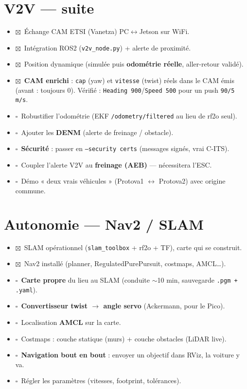 \documentclass[a4paper,11pt]{article}
\newcommand{\todo}{$\square$\ }
\newcommand{\done}{\textcolor{success}{$\boxtimes$}\ }
\begin{document}
\section{V2V --- suite}
\begin{itemize}[leftmargin=1.6em, label={}]
  \item \done Échange CAM ETSI (Vanetza) PC$\leftrightarrow$Jetson sur WiFi.
  \item \done Intégration ROS2 (\texttt{v2v\_node.py}) + alerte de proximité.
  \item \done Position dynamique (simulée puis \textbf{odométrie réelle}, aller-retour validé).
  \item \done \textbf{CAM enrichi} : \texttt{cap} (yaw) et \texttt{vitesse} (twist) réels dans
        le CAM émis (avant : toujours 0). Vérifié : \texttt{Heading 900}/\texttt{Speed 500}
        pour un push \texttt{90\textdegree{}/5\,m/s}.
  \item \todo Robustifier l'odométrie (EKF \texttt{/odometry/filtered} au lieu de rf2o seul).
  \item \todo Ajouter les \textbf{DENM} (alerte de freinage / obstacle).
  \item \todo \textbf{Sécurité} : passer en \texttt{--security certs} (messages signés, vrai C-ITS).
  \item \todo Coupler l'alerte V2V au \textbf{freinage (AEB)} --- nécessitera l'ESC.
  \item \todo Démo « deux vrais véhicules » (Protova1 $\leftrightarrow$ Protova2) avec origine commune.
\end{itemize}

\section{Autonomie --- Nav2 / SLAM}
\begin{itemize}[leftmargin=1.6em, label={}]
  \item \done SLAM opérationnel (\texttt{slam\_toolbox} + rf2o + TF), carte qui se construit.
  \item \done Nav2 installé (planner, RegulatedPurePursuit, costmaps, AMCL\ldots).
  \item \todo \textbf{Carte propre} du lieu au SLAM (conduite $\sim$10 min, sauvegarde
        \texttt{.pgm + .yaml}).
  \item \todo \textbf{Convertisseur twist $\rightarrow$ angle servo} (Ackermann, pour le Pico).
  \item \todo Localisation \textbf{AMCL} sur la carte.
  \item \todo Costmaps : couche statique (murs) + couche obstacles (LiDAR live).
  \item \todo \textbf{Navigation bout en bout} : envoyer un objectif dans RViz, la voiture y va.
  \item \todo Régler les paramètres (vitesses, footprint, tolérances).
\end{itemize}
\end{document}
